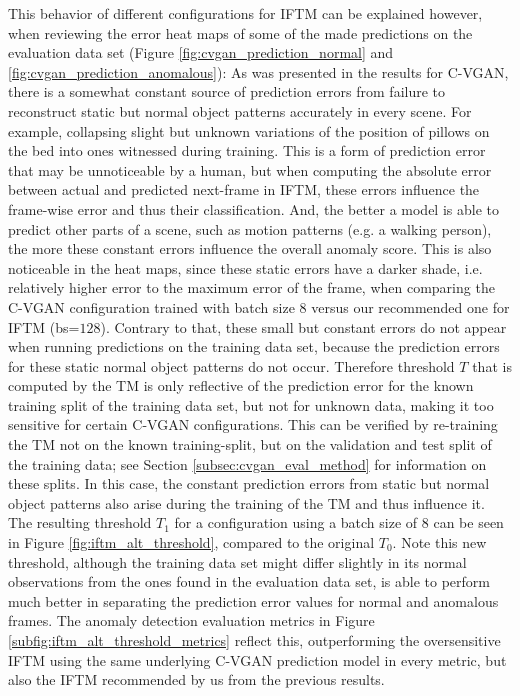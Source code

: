 This behavior of different configurations for IFTM can be explained however, when reviewing the error heat maps of some of the made predictions on the evaluation data set (Figure \ref{fig:cvgan_prediction_normal} and \ref{fig:cvgan_prediction_anomalous}): As was presented in the results for C-VGAN, there is a somewhat constant source of prediction errors from failure to reconstruct static but normal object patterns accurately in every scene. For example, collapsing slight but unknown variations of the position of pillows on the bed into ones witnessed during training. This is a form of prediction error that may be unnoticeable by a human, but when computing the absolute error between actual and predicted next-frame in IFTM, these errors influence the frame-wise error and thus their classification. And, the better a model is able to predict other parts of a scene, such as motion patterns (e.g. a walking person), the more these constant errors influence the overall anomaly score. This is also noticeable in the heat maps, since these static errors have a darker shade, i.e. relatively higher error to the maximum error of the frame, when comparing the C-VGAN configuration trained with batch size $8$ versus our recommended one for IFTM (bs=$128$). Contrary to that, these small but constant errors do not appear when running predictions on the training data set, because the prediction errors for these static normal object patterns do not occur. Therefore threshold $T$ that is computed by the TM is only reflective of the prediction error for the known training split of the training data set, but not for unknown data, making it too sensitive for certain C-VGAN configurations. This can be verified by re-training the TM not on the known training-split, but on the validation and test split of the training data; see Section \ref{subsec:cvgan_eval_method} for information on these splits. In this case, the constant prediction errors from static but normal object patterns also arise during the training of the TM and thus influence it. The resulting threshold $T_1$ for a configuration using a batch size of $8$ can be seen in Figure \ref{fig:iftm_alt_threshold}, compared to the original $T_0$. Note this new threshold, although the training data set might differ slightly in its normal observations from the ones found in the evaluation data set, is able to perform much better in separating the prediction error values for normal and anomalous frames. The anomaly detection evaluation metrics in Figure \ref{subfig:iftm_alt_threshold_metrics} reflect this, outperforming the oversensitive IFTM using the same underlying C-VGAN prediction model in every metric, but also the IFTM recommended by us from the previous results.

